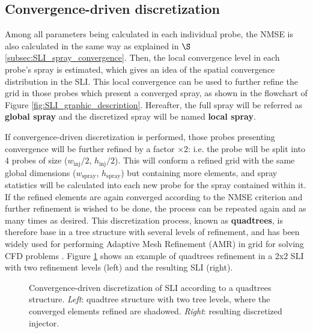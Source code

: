 \subsection{Convergence-driven discretization}
\label{subsec:SLI_quadtrees_discretization}

Among all parameters being calculated in each individual probe, the NMSE is also calculated in the same way as explained in $\S$\ref{subsec:SLI_spray_convergence}. Then, the local convergence level in each probe's spray is estimated, which gives an idea of the spatial convergence distribution in the SLI. This local convergence can be used to further refine the grid in those probes which present a converged spray, as shown in the flowchart of Figure \ref{fig:SLI_graphic_description}. Hereafter, the full spray will be referred as \textbf{global spray} and the discretized spray will be named \textbf{local spray}.

If convergence-driven discretization is performed, those probes presenting convergence will be further refined by a factor $\times 2$: i.e. the probe will be split into 4 probes of size ($w_\mathrm{inj}/2$, $h_\mathrm{inj}/2$). This will conform a refined grid with the same global dimensions ($w_\mathrm{spray}$, $h_\mathrm{spray}$) but containing more elements, and spray statistics will be calculated into each new probe for the spray contained within it. If the refined elements are again converged according to the NMSE criterion and further refinement is wished to be done, the process can be repeated again and as many times as desired. This discretization process, known as \textbf{quadtrees}, is therefore base in a tree structure with several levels of refinement, and has been widely used for performing Adaptive Mesh Refinement (AMR) in grid for solving CFD problems . Figure \ref{fig:quadtrees_tree_structure} shows an example of quadtrees refinement in a 2x2 SLI with two refinement levels (left) and the resulting SLI (right).



\begin{figure}[h!]	
	\centering
	\caption[Convergence-driven discretization of SLI according to a quadtrees structure.]{Convergence-driven discretization of SLI according to a quadtrees structure. \textsl{Left}: quadtree structure with two tree levels, where the converged elements refined are shadowed. \textsl{Right}: resulting discretized injector. }
	\label{fig:quadtrees_tree_structure}
\end{figure}


